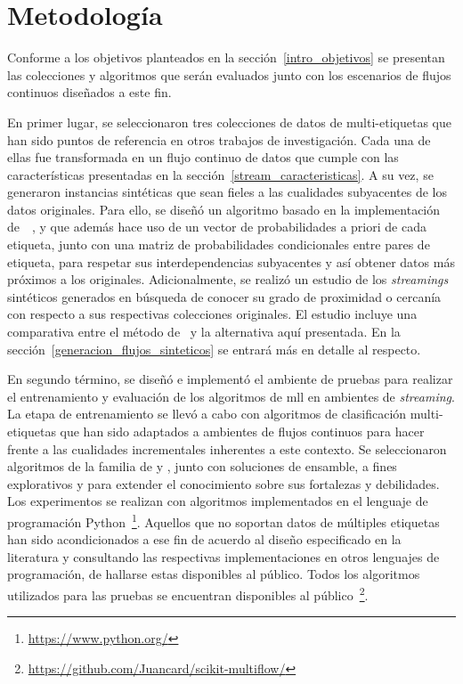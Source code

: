 \chapter{Metodología}
\label{chapter:metodologia}

Conforme a los objetivos planteados en la sección~\ref{intro_objetivos} se
presentan las colecciones y algoritmos que serán evaluados junto con los
escenarios de flujos continuos diseñados a este fin.

En primer lugar, se seleccionaron tres colecciones de datos de multi-etiquetas
que han sido puntos de referencia en otros trabajos de investigación. Cada una
de ellas fue transformada en un flujo continuo de datos que cumple con las
características presentadas en la sección~\ref{stream_caracteristicas}. A su
vez, se generaron instancias sintéticas que sean fieles a las cualidades
subyacentes de los datos originales.  Para ello, se diseñó un algoritmo basado
en la implementación
de~\citeauthor{read_multi-label_2008}~\cite{read_multi-label_2008}, y que además
hace uso de un vector de probabilidades a priori de cada etiqueta, junto con una
matriz de probabilidades condicionales entre pares de etiqueta, para respetar
sus interdependencias subyacentes y así obtener datos más próximos a los
originales. Adicionalmente, se realizó un estudio de los \textit{streamings}
sintéticos generados en búsqueda de conocer su grado de proximidad o cercanía
con respecto a sus respectivas colecciones originales. El estudio incluye una
comparativa entre el método de~\citeauthor{read_multi-label_2008} y la
alternativa aquí presentada. En la sección~\ref{generacion_flujos_sinteticos} se
entrará más en detalle al respecto.

En segundo término, se diseñó e implementó el ambiente de pruebas para realizar
el entrenamiento y evaluación de los algoritmos de \acrshort{mll} en ambientes
de \textit{streaming}. La etapa de entrenamiento se llevó a cabo con algoritmos
de clasificación multi-etiquetas que han sido adaptados a ambientes de flujos
continuos para hacer frente a las cualidades incrementales inherentes a este
contexto. Se seleccionaron algoritmos de la familia de  y , junto con soluciones de
ensamble, a fines explorativos y para extender el conocimiento sobre sus
fortalezas y debilidades.  Los experimentos se realizan con algoritmos
implementados en el lenguaje de programación
Python~\footnote{\url{https://www.python.org/}}.  Aquellos que no soportan datos
de múltiples etiquetas han sido acondicionados a ese fin de acuerdo al diseño
especificado en la literatura y consultando las respectivas implementaciones en
otros lenguajes de programación, de hallarse estas disponibles al público. Todos
los algoritmos utilizados para las pruebas se encuentran disponibles al
público~\footnote{\url{https://github.com/Juancard/scikit-multiflow/}}.


